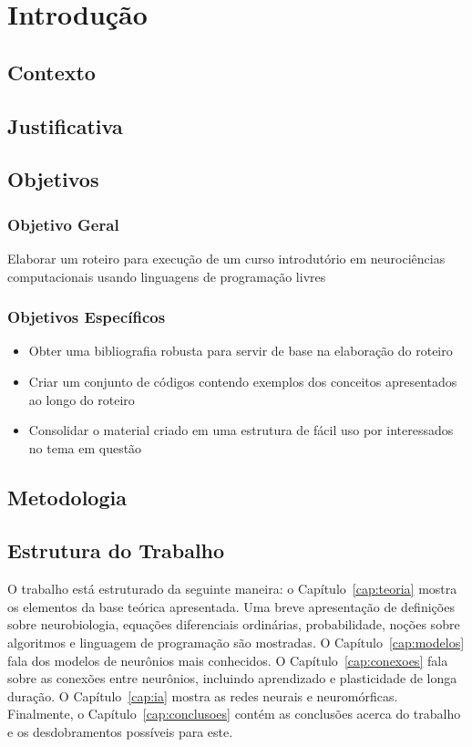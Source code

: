 \chapter{Introdução}\label{cap:introducao}
\section{Contexto}

\section{Justificativa}

\section{Objetivos}
\subsection{Objetivo Geral}
Elaborar um roteiro para execução de um curso introdutório em neurociências computacionais usando linguagens de programação livres

\subsection{Objetivos Específicos}
\begin{itemize}
\item Obter uma bibliografia robusta para servir de base na elaboração do roteiro
\item Criar um conjunto de códigos contendo exemplos dos conceitos apresentados ao longo do roteiro
\item Consolidar o material criado em uma estrutura de fácil uso por interessados no tema em questão
\end{itemize}

\section{Metodologia}

\section{Estrutura do Trabalho}
O trabalho está estruturado da seguinte maneira: o Capítulo~\ref{cap:teoria} mostra os elementos da base teórica apresentada. Uma breve apresentação de definições sobre neurobiologia, equações diferenciais ordinárias, probabilidade, noções sobre algoritmos e linguagem de programação são mostradas. O Capítulo~\ref{cap:modelos} fala dos modelos de neurônios mais conhecidos. O Capítulo~\ref{cap:conexoes} fala sobre as conexões entre neurônios, incluindo aprendizado e plasticidade de longa duração. O Capítulo~\ref{cap:ia} mostra as redes neurais e neuromórficas.
Finalmente, o Capítulo~\ref{cap:conclusoes} contém as conclusões acerca do trabalho e os desdobramentos possíveis para este.
